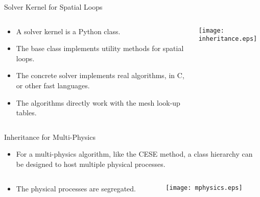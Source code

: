 \documentclass[dvips,xcolor=pst,14pt]{beamer}
\begin{document}
\begin{frame}{
%
Solver Kernel for Spatial Loops
%
}
\begin{columns}[c]
\begin{column}{.75\textwidth}
\begin{itemize}
  \item A solver kernel is a Python class.
  \item The base class implements utility methods for \alert{spatial loops}.
  \item The concrete solver implements real algorithms, in \alert{C}, or other
  fast languages.
  \item The algorithms directly work with the mesh look-up tables.
\end{itemize}
\end{column}
\begin{column}{.25\textwidth} \centering
  \texttt{[image: inheritance.eps]}
\end{column}
\end{columns}
\end{frame}

\begin{frame}{
%
Inheritance for Multi-Physics
%
}
\begin{itemize}
  \item For a multi-physics algorithm, like the CESE method, a class hierarchy
  can be designed to host multiple physical processes.
\end{itemize}
\begin{columns}[c]
\begin{column}{.5\textwidth}
\begin{itemize}
  \item The physical processes are segregated.
\end{itemize}
\end{column}
\begin{column}{.5\textwidth} \centering
  \texttt{[image: mphysics.eps]}
\end{column}
\end{columns}
\end{frame}
\end{document}
